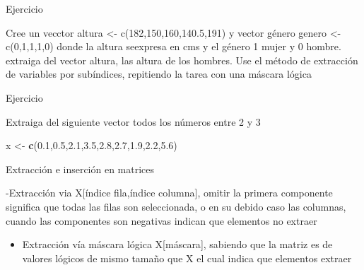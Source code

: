 \documentclass[ignorenonframetext,]{beamer}
\newenvironment{Shaded}{\begin{snugshade}}{\end{snugshade}}
\newcommand{\KeywordTok}[1]{\textcolor[rgb]{0.13,0.29,0.53}{\textbf{#1}}}
\newcommand{\FloatTok}[1]{\textcolor[rgb]{0.00,0.00,0.81}{#1}}
\newcommand{\StringTok}[1]{\textcolor[rgb]{0.31,0.60,0.02}{#1}}
\newcommand{\NormalTok}[1]{#1}
\providecommand{\tightlist}{%
  \setlength{\itemsep}{0pt}\setlength{\parskip}{0pt}}
\begin{document}
\begin{frame}{Ejercicio}

Cree un vecctor altura \textless{}- c(182,150,160,140.5,191) y vector
género genero \textless{}- c(0,1,1,1,0) donde la altura seexpresa en cms
y el género 1 mujer y 0 hombre. extraiga del vector altura, las altura
de los hombres. Use el método de extracción de variables por subíndices,
repitiendo la tarea con una máscara lógica

\end{frame}

\begin{frame}[fragile]{Ejercicio}

Extraiga del siguiente vector todos los números entre 2 y 3

\begin{Shaded}
\begin{Highlighting}[]
\NormalTok{x <-}\StringTok{ }\KeywordTok{c}\NormalTok{(}\FloatTok{0.1}\NormalTok{,}\FloatTok{0.5}\NormalTok{,}\FloatTok{2.1}\NormalTok{,}\FloatTok{3.5}\NormalTok{,}\FloatTok{2.8}\NormalTok{,}\FloatTok{2.7}\NormalTok{,}\FloatTok{1.9}\NormalTok{,}\FloatTok{2.2}\NormalTok{,}\FloatTok{5.6}\NormalTok{)}
\end{Highlighting}
\end{Shaded}

\end{frame}

\begin{frame}{Extracción e inserción en matrices}

-Extracción via X{[}índice fila,índice columna{]}, omitir la primera
componente significa que todas las filas son seleccionada, o en su
debido caso las columnas, cuando las componentes son negativas indican
que elementos no extraer

\begin{itemize}
\tightlist
\item
  Extracción vía máscara lógica X{[}máscara{]}, sabiendo que la matriz
  es de valores lógicos de mismo tamaño que X el cual indica que
  elementos extraer
\end{itemize}

\end{frame}
\end{document}
